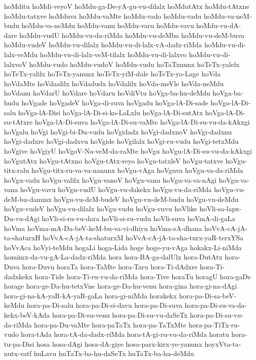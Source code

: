 {hoMditu
hoMdi-veyoV
hoMdu-ga-De-yA-gu-vu-dilalx
hoMdutAtx
hoMdu-tAtxne
hoMdu-tatxve
hoMduva
hoMdu-vaMte
hoMdu-vado
hoMdu-vadu
hoMdu-va-neM-budu
hoMdu-va-neMdu
hoMdu-vanu
hoMdu-varu
hoMdu-vavu
hoMdu-vu-dA-dare
hoMdu-vudU
hoMdu-vu-da-riMda
hoMdu-vu-deMba
hoMdu-vu-deM-buva
hoMdu-vudeV
hoMdu-vu-dilalx
hoMdu-vu-di-lalx-vA-dadx-riMda
hoMdu-vu-di-lalx-veMdu
hoMdu-vu-di-lalx-veM-tilalx
hoMdu-vu-di-lalxvo
hoMdu-vu-di-lalxvoV
hoMdu-vudo
hoMdu-vudoV
hoMdu-vudu
hoTaTxnunx
hoTeTx-yalelx
hoTeTx-yalilx
hoTeTx-yanunx
hoTeTx-yiM-dale
hoTeTx-yo-Lage
hoVda
hoVdaMte
hoVdaalilx
hoVdadudx
hoVdalilx
hoVda-meVle
hoVda-neMdu
hoVdanu
hoVdarU
hoVdare
hoVdaru
hoVdiVtu
hoVga-ba-hu-deMdu
hoVga-ba-hudu
hoVgade
hoVgadeV
hoVga-di-ruva
hoVgadu
hoVga-lA-Di-sade
hoVga-lA-Di-salu
hoVga-lA-Disi
hoVga-lA-Di-si-ko-LaLxlu
hoVga-lA-Di-sutAtx
hoVga-lA-Di-su-tAtxre
hoVga-lA-Di-suva
hoVga-lA-Di-su-vaMte
hoVga-lA-Di-su-vu-da-kAkxgi
hoVgalu
hoVgi
hoVgi-bi-Du-vudu
hoVgidadx
hoVgi-dadxnoV
hoVgi-dadxnu
hoVgi-dadxre
hoVgi-dadxvu
hoVgide
hoVgilalx
hoVgi-ru-vudu
hoVgi-tetxMdu
hoVgive
hoVgiyU
hoVgoV-Na-veM-da-raMte
hoVgu
hoVgu-lA-Di-su-vu-da-kAkxgi
hoVgutAtx
hoVgu-tAtxno
hoVgu-tAtx-reyo
hoVgu-tatxleV
hoVgu-tatxve
hoVgu-titx-ralu
hoVgu-titx-ru-va-va-nanunx
hoVgu-vAga
hoVguva
hoVgu-va-da-riMda
hoVgu-vadu
hoVgu-valilx
hoVgu-vanoV
hoVgu-vanu
hoVgu-va-va-nAgi
hoVgu-va-vana
hoVgu-vavu
hoVgu-vudU
hoVgu-vu-dakekx
hoVgu-vu-da-riMda
hoVgu-vu-deM-bu-danunx
hoVgu-vu-deM-budeV
hoVgu-vu-deM-budu
hoVgu-vu-deMdu
hoVgu-vudeV
hoVgu-vu-dilalx
hoVgu-vudu
hoVgu-vuvu
hoVlike
hoVli-sa-lapx-Du-vu-dAgi
hoVli-si-ru-vu-dara
hoVli-si-ru-vudu
hoVli-suva
hoVmA-di-gaLa
hoVma
hoVma-mA-Da-beV-keM-bu-va-vi-dhiyu
hoVma-sA-dhana
hoVvA-cA-jA-ta-shaturxH
hoVvA-cA-jA-ta-shaturxM
hoVvA-cA-jA-ta-sha-turx-yaR-terxYSa
hoVvAca
hoVyi-teMdu
hogaLi
hoga-Lida
hoge
hoge-yu-vAga
hokakx-Li-niMda
homimx-da-vu-gA-La-dadx-riMda
hora
hora-BA-ga-dalUlx
hora-DutAtx
hora-Duva
hora-Duvu
horaTa
hora-TaMte
hora-Taru
hora-Ti-dAdxre
hora-Ti-dadxkekx
hora-Tide
hora-Ti-ru-vu-da-riMda
hora-Tive
horaTu
horagU
hora-gaDe
horage
hora-ge-Da-hu-tetxVne
hora-ge-Da-hu-venu
hora-gina
hora-gi-na-dAgi
hora-gi-na-kA-yaR-kA-yaR-gaLa
hora-gi-niMda
horakekx
hora-pa-Di-sa-beV-keMdu
hora-pa-Di-salu
hora-pa-Di-si-davu
hora-pa-Di-suva
hora-pa-Di-su-va-da-kekx-beV-kAda
hora-pa-Di-su-venu
hora-pa-Di-su-vu-daSeTx
hora-pa-Di-su-vu-da-riMda
hora-pa-Du-vaMte
hora-paTaTx
hora-pa-TaTxMte
hora-pa-TiTx-ru-vudo
hora-tAda
hora-tA-da-dadx-riMda
hora-tA-gi-ru-vu-da-riMda
horatu
hora-tu-pa-Disi
hosa
hosa-dAgi
hosa-dA-giye
hosa-parx-kirx-ye-yanunx
hoyxVta-ta-nutx-vatf
huLavu
huTaTx-ba-hu-daSeTx
huTaTx-ba-hu-deMdu
}
